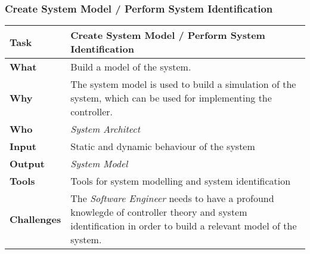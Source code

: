 \subsubsection{Create System Model / Perform System Identification}
	\begin{tabularx}{\textwidth}{@{} l X @{}}
		\caption{Create System Model / Perform System Identification} \label{table:ch6_Task_Controler_Tuning}\\
		\toprule 
		\bfseries Task & Create System Model / Perform System Identification\\
		\midrule 
		\bfseries What & Build a model of the system.\\
		\midrule 
		\bfseries Why & The system model is used to build a simulation of the system, which can be used for implementing the controller.\\
		\midrule 
		\bfseries Who & \emph{System Architect}\\
		\midrule 
		\bfseries Input & Static and dynamic behaviour of the system\\ 
		\midrule 
		\bfseries Output & \emph{System Model}\\
		\midrule 
		\bfseries Tools & Tools for system modelling and system identification\\
		\midrule 
		\bfseries Challenges & The \emph{Software Engineer} needs to have a profound knowlegde of controller theory and system identification in order to build a relevant model of the system.
			\\
		\bottomrule 
	\end{tabularx}

